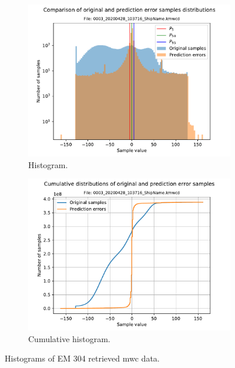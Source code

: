 \begin{figure}[h!]
	\centering
	\begin{subfigure}{0.5\textwidth}
		\centering
		\includegraphics[width=\linewidth]{images/0003_20200428_103716_ShipName.kmwcd_hist.pdf}
		\caption{Histogram.}
		\label{fig:hist_003_kmall}
	\end{subfigure}%
	\begin{subfigure}{0.5\textwidth}
		\centering
		\includegraphics[width=\linewidth]{images/0003_20200428_103716_ShipName.kmwcd_hist_cum.pdf}
		\caption{Cumulative histogram.}
		\label{fig:cum_hist_003_kmall}
	\end{subfigure}
	\caption{Histograms of EM 304 retrieved \acrshort{mwc} data.}
	\label{fig:0003_kmall}
\end{figure}

